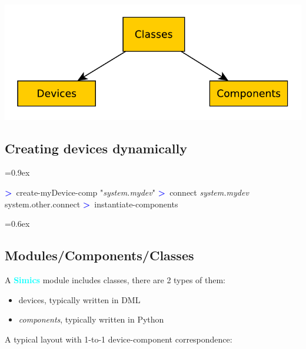 \documentclass[8pt]{extarticle}
\newenvironment{code}[1][]{%
\begin{prebox}[#1]\obeylines%
\fontdimen2\font=0.9ex%
}{%
\end{prebox}%
\fontdimen2\font=0.6ex%
}
\newcommand{\sprompt}{\textcolor{blue}{\textbf{>}\ }}
\newcommand{\p}[1]{\textit{\large#1}}
\newcommand{\Simics}{\textcolor{cyan}{\textbf{Simics}}}
\newlength{\MyLen}
\begin{document}
\begin{multicols*}{3}
\begin{tabular}{p{\the\MyLen}p{\linewidth-\the\MyLen-0.8cm}}
    \end{tabular}

\includegraphics[width=\linewidth]{diagrams/classes_devices_components.pdf}
\subsection{Creating devices dynamically}
\begin{code}
\sprompt create-myDevice-comp "\p{system.mydev}"
\sprompt connect \p{system.mydev} {system.other.connect}
\sprompt instantiate-components
\end{code}

\subsection{Modules/Components/Classes}
A \Simics{} module includes classes, there are 2 types of them:
        \begin{itemize}
            \item devices, typically written in DML
            \item \textit{components}, typically written in Python
        \end{itemize}
%
%
%


A typical layout with 1-to-1 device-component correspondence:

\end{multicols*}
\end{document}
